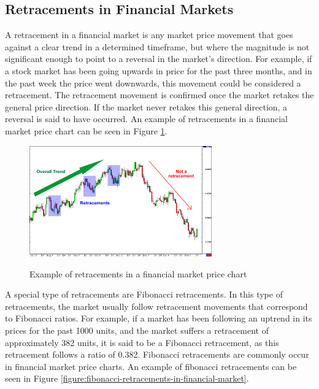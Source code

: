 \subsection{Retracements in Financial Markets}
\label{subsection:retracements-in-financial-markets}

A retracement in a financial market is any market price movement that goes
against a clear trend in a determined timeframe, but where the magnitude is not
significant enough to point to a reversal in the market's direction. For
example, if a stock market has been going upwards in price for the past three
months, and in the past week the price went downwards, this movement could be
considered a retracement. The retracement movement is confirmed once the market
retakes the general price direction. If the market never retakes this general
direction, a reversal is said to have occurred. An example of retracements in a
financial market price chart can be seen in Figure
\ref{figure:retracements-in-financial-market}.

\begin{figure}
\caption{Example of retracements in a financial market price chart} \centering
\includegraphics[width=0.7\textwidth]{img/retracements.png}
\label{figure:retracements-in-financial-market}
\end{figure}

A special type of retracements are Fibonacci retracements. In this type of
retracements, the market usually follow retracement movements that correspond to
Fibonacci ratios. For example, if a market has been following an uptrend in its
prices for the past 1000 units, and the market suffers a retracement of
approximately 382 units, it is said to be a Fibonacci retracement, as this
retracement follows a ratio of 0.382. Fibonacci retracements are commonly occur
in financial market price charts. An example of fibonacci retracements can be
seen in Figure \ref{figure:fibonacci-retracements-in-financial-market}.

